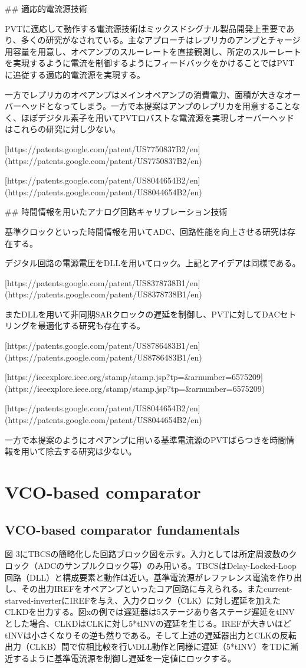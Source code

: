 \documentclass[letterpaper, 10 pt, conference]{ieeeconf}  %
\begin{document}
## 適応的電流源技術

PVTに適応して動作する電流源技術はミックスドシグナル製品開発上重要であり、多くの研究がなされている。主なアプローチはレプリカのアンプとチャージ用容量を用意し、オペアンプのスルーレートを直接観測し、所定のスルーレートを実現するように電流を制御するようにフィードバックをかけることではPVTに追従する適応的電流源を実現する。

一方でレプリカのオペアンプはメインオペアンプの消費電力、面積が大きなオーバーヘッドとなってしまう。一方で本提案はアンプのレプリカを用意することなく、ほぼデジタル素子を用いてPVTロバストな電流源を実現しオーバーヘッドはこれらの研究に対し少ない。

[https://patents.google.com/patent/US7750837B2/en](https://patents.google.com/patent/US7750837B2/en)

[https://patents.google.com/patent/US8044654B2/en](https://patents.google.com/patent/US8044654B2/en)

## 時間情報を用いたアナログ回路キャリブレーション技術

基準クロックといった時間情報を用いてADC、回路性能を向上させる研究は存在する。

デジタル回路の電源電圧をDLLを用いてロック。上記とアイデアは同様である。

[https://patents.google.com/patent/US8378738B1/en](https://patents.google.com/patent/US8378738B1/en)

またDLLを用いて非同期SARクロックの遅延を制御し、PVTに対してDACセトリングを最適化する研究も存在する。

[https://patents.google.com/patent/US8786483B1/en](https://patents.google.com/patent/US8786483B1/en)

[https://ieeexplore.ieee.org/stamp/stamp.jsp?tp=&arnumber=6575209](https://ieeexplore.ieee.org/stamp/stamp.jsp?tp=&arnumber=6575209)

[https://patents.google.com/patent/US8044654B2/en](https://patents.google.com/patent/US8044654B2/en)

一方で本提案のようにオペアンプに用いる基準電流源のPVTばらつきを時間情報を用いて除去する研究は少ない。

\section{VCO-based comparator}
\subsection{VCO-based comparator fundamentals}
図 3にTBCSの簡略化した回路ブロック図を示す。入力としては所定周波数のクロック（ADCのサンプルクロック等）のみ用いる。TBCSはDelay-Locked-Loop回路（DLL）と構成要素と動作は近い。基準電流源がレファレンス電流を作り出し、その出力IREFをオペアンプといったコア回路に与えられる。またcurrent-starved-inverterにIREFを与え、入力クロック（CLK）に対し遅延を加えたCLKDを出力する。図xの例では遅延器は5ステージあり各ステージ遅延をtINVとした場合、CLKDはCLKに対し5*tINVの遅延を生じる。IREFが大きいほどtINVは小さくなりその逆も然りである。そして上述の遅延器出力とCLKの反転出力（CLKB）間で位相比較を行いDLL動作と同様に遅延（5*tINV）をTDに漸近するように基準電流源を制御し遅延を一定値にロックする。
\end{document}
